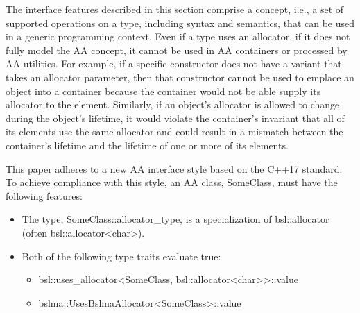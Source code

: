 The interface features described in this section comprise a concept, i.e., a
set of supported operations on a type, including syntax and semantics, that
can be used in a generic programming context. Even if a type uses an allocator,
if it does not fully model the AA concept, it cannot be used in AA containers
or processed by AA utilities. For example, if a specific constructor does not
have a variant that takes an allocator parameter, then that constructor cannot
be used to emplace an object into a container because the container would not
be able supply its allocator to the element. Similarly, if an object’s
allocator is allowed to change during the object’s lifetime, it would violate
the container’s invariant that all of its elements use the same allocator and
could result in a mismatch between the container’s lifetime and the lifetime
of one or more of its elements.

This paper adheres to a new AA interface style based on the C++17 standard.
To achieve compliance with this style, an AA class, SomeClass, must have the
following features:
\begin{itemize}
\item The type, SomeClass::allocator_type, is a specialization of
  bsl::allocator (often bsl::allocator<char>).
\item Both of the following type traits evaluate true:
  \begin{itemize}
  \item bsl::uses_allocator<SomeClass, bsl::allocator<char>>::value
  \item bslma::UsesBslmaAllocator<SomeClass>::value
  \end{itemize}
\end{itemize}


